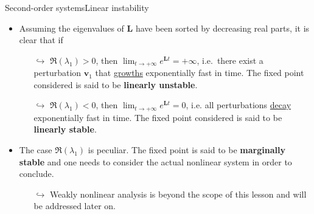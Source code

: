\documentclass[usenames,dvipsnames,svgnames,10pt,aspectratio=169]{beamer}
\begin{document}
\begin{frame}[t, c]{Second-order systems}{Linear instability}
	\begin{itemize}
		\item Assuming the eigenvalues of ${\bm L}$ have been sorted by decreasing real parts, it is clear that if

		\begin{itemize}
			\item[$\hookrightarrow$] $\Re(\lambda_1) > 0$, then $\lim_{t \to +\infty} e^{{\bm L} t} = + \infty$, i.e.\ there exist a perturbation ${\bm v}_1$ that \underline{growths} exponentially fast in time. The fixed point considered is said to be \alert{\textbf{linearly unstable}}.

			\medskip

			\item[$\hookrightarrow$] $\Re(\lambda_1) < 0$, then $\lim_{t \to +\infty} e^{{\bm L} t} = 0$, i.e. all perturbations \underline{decay} exponentially fast in time. The fixed point considered is said to be \alert{\textbf{linearly stable}}.

		\end{itemize}

		\bigskip

		\item The case $\Re(\lambda_1)$ is peculiar. The fixed point is said to be \alert{\textbf{marginally stable}} and one needs to consider the actual nonlinear system in order to conclude.
		\begin{itemize}
			\item[$\hookrightarrow$] Weakly nonlinear analysis is beyond the scope of this lesson and will be addressed later on.
		\end{itemize}
	\end{itemize}

	\vspace{1cm}
\end{frame}
\end{document}
